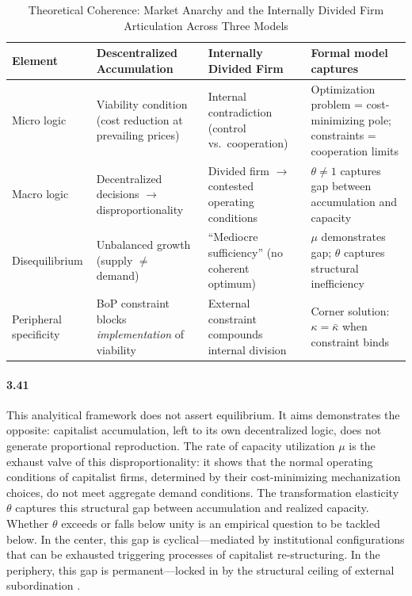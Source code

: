 \begin{table}[H]
	\centering
	\small
	\caption{Theoretical Coherence: Market Anarchy and the Internally Divided Firm Articulation Across Three Models}
	\label{tab:coherence}
	\begin{tabular}{p{2.2cm}p{3.8cm}p{3.8cm}p{4.2cm}}
		\toprule
		\textbf{Element} & \textbf{Descentralized Accumulation} &
		\textbf{Internally Divided Firm} & \textbf{Formal model captures} \\
		\midrule
		\midrule
		Micro logic & Viability condition (cost
		reduction at prevailing prices) & Internal
		contradiction (control vs.\ cooperation) &
		Optimization problem = cost-minimizing pole;
		constraints = cooperation limits \\
		Macro logic & Decentralized decisions $\to$
		disproportionality & Divided firm $\to$
		contested operating conditions & $\theta \neq 1$
		captures gap between accumulation and capacity \\
		Disequilibrium & Unbalanced growth (supply
		$\neq$ demand) & ``Mediocre sufficiency''
		\citep{Vidal2022} (no coherent optimum) & $\mu$
		demonstrates gap; $\theta$ captures structural
		inefficiency \\
		Peripheral specificity & BoP constraint blocks
		\textit{implementation} of viability & External
		constraint compounds internal division & Corner
		solution: $\kappa = \bar{\kappa}$ when
		constraint binds \\
		\bottomrule
	\end{tabular}
\end{table}

\paragraph{3.41}
This analyitical framework does not assert equilibrium. It aims 
demonstrates the opposite: capitalist accumulation,
left to its own decentralized logic, does not generate
proportional reproduction. The rate of capacity utilization 
$\mu$ is the exhaust valve of this
disproportionality: it shows that the normal operating
conditions of capitalist firms, determined by their
cost-minimizing mechanization choices, do not meet
aggregate demand conditions. The transformation elasticity
$\theta$ captures this structural gap between accumulation
and realized capacity. Whether $\theta$ exceeds or falls
below unity is an empirical question to be tackled below. In the center, this gap is cyclical---mediated by institutional configurations that
can be exhausted triggering processes of capitalist re-structuring. In the periphery, this gap is permanent---locked in by the structural ceiling of
external subordination \citep{Kaldor1959,Prebisch1981}.

